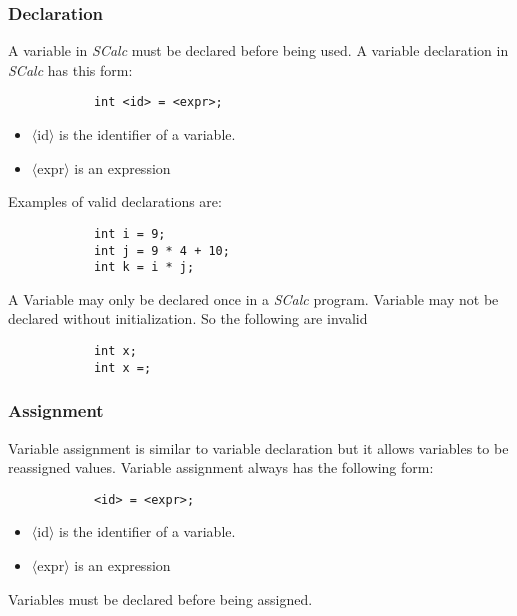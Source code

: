 \documentclass{article}
\begin{document}
	\subsubsection{Declaration}

		A variable in \textit{SCalc} must be declared before being used. A variable declaration in \textit{SCalc} has
		this form:

		\begin{lstlisting}
			int <id> = <expr>;
		\end{lstlisting}

		\begin{itemize}
			\item{$\langle$id$\rangle$} is the identifier of a variable.
			\item{$\langle$expr$\rangle$} is an expression
		\end{itemize}

		Examples of valid declarations are:

		\begin{lstlisting}
			int i = 9;
			int j = 9 * 4 + 10;
			int k = i * j;
		\end{lstlisting}

		A Variable may only be declared once in a \textit{SCalc} program. Variable may not be declared without
		initialization. So the following are invalid

		\begin{lstlisting}
			int x;
			int x =;
		\end{lstlisting}


	\subsubsection{Assignment}

		Variable assignment is similar to variable declaration but it allows variables to be reassigned values. Variable
		assignment always has the following form:

		\begin{lstlisting}
			<id> = <expr>;
		\end{lstlisting}

		\begin{itemize}
			\item{$\langle$id$\rangle$} is the identifier of a variable.
			\item{$\langle$expr$\rangle$} is an expression
		\end{itemize}

		Variables must be declared before being assigned.
\end{document}
